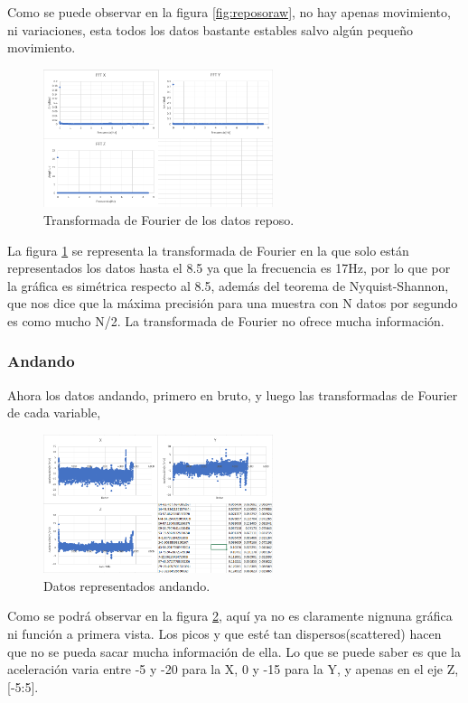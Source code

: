 \documentclass[12pt]{article}
\numberwithin{equation}{section}
\begin{document}
Como se puede observar en la figura \ref{fig:reposoraw}, no hay apenas movimiento, ni variaciones, esta todos los datos bastante estables salvo algún pequeño movimiento.

\begin{figure}[h]
    \centering
    \includegraphics[width=0.6\textwidth]{reposofft.png}
    \caption{Transformada de Fourier de los datos reposo.}
    \label{fig:reposofft}
\end{figure}

La figura \ref{fig:reposofft} se representa la transformada de Fourier en la que solo están representados los datos hasta el 8.5 ya que la frecuencia es 17Hz, por lo que por la gráfica es simétrica respecto al 8.5, además del teorema de Nyquist-Shannon, que nos dice que la máxima precisión para una muestra con N datos por segundo es como mucho N/2. La transformada de Fourier no ofrece mucha información.
\subsubsection{Andando}

Ahora los datos andando, primero en bruto, y luego las transformadas de Fourier de cada variable,
\begin{figure}[h]
    \centering
    \includegraphics[width=0.6\textwidth]{andandoraw.png}
    \caption{Datos representados andando.}
    \label{fig:andandoraw}
\end{figure}

Como se podrá observar en la figura \ref{fig:andandoraw}, aquí ya no es claramente nignuna gráfica ni función a primera vista. Los picos y que esté tan dispersos(scattered) hacen que no se pueda sacar mucha información de ella. Lo que se puede saber es que la aceleración varia entre -5 y -20 para la X, 0 y -15 para la Y, y apenas en el eje Z, [-5:5].
\end{document}
